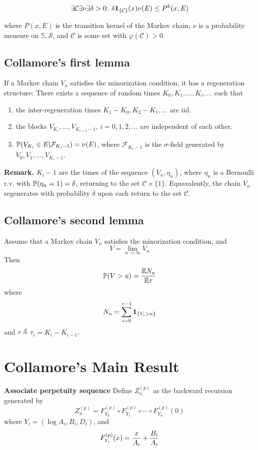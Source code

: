\documentclass[12pt]{article}
\begin{document}
\begin{equation}\label{eq:M}
\exists \mathcal C \exists \nu \exists \delta > 0\text{: }
\delta \I{\mathcal C}(x) \nu(E) \leq P^k(x, E)
\end{equation}

where $P(x, E)$ is the transition kernel of the Markov chain, $\nu$
is a probability measure on $\mathbb S, \mathcal S$, and $\mathcal C$
is some set with $\varphi(\mathcal C) > 0$.

\subsection{Collamore's first lemma}
If a Markov chain $V_n$ satisfies the minorization condition, it has a
regeneration structure: There exists a sequence of random times $K_0,
K_1, \dots, K_i, \dots$ such that
\begin{enumerate}
\item the inter-regeneration times $K_1 - K_0, K_2 - K_1, \dots$ are iid.
\item the blocks $V_{K_i}, \dots, V_{K_{i+1}-1}$, $i=0, 1, 2, \dots$ are
independent of each other.

\item $\P(V_{K_i} \in E | \mathcal F_{K_i - 1}) = \nu(E)$, where $\mathcal
F_{K_i - 1}$ is the $\sigma$-field generated by $V_0, V_1, \dots, V_{K_i-1}$.
\end{enumerate}

{\bf Remark. } $K_i-1$ are the times of the sequence $(V_n, \eta_n)$, where
$\eta_n$ is a Bernoulli r.v. with $\P(\eta_n = 1) = \delta$, returning to
the set $\mathcal C \times \{1\}$. Equavalently, the chain $V_n$ regenerates
with probability $\delta$ upon each return to the set $\mathcal C$.

\subsection{Collamore's second lemma}
Assume that a Markov chain $V_n$ satisfies the minorization condition, and
\[
        V = \lim_{n \to \infty} V_n
\]
Then
\[
\P(V > u) = {\E N_u \over \E \tau}
\]
where
\[
        N_u = \sum_{i=0}^{\tau - 1} \I{V_i > u}
\]
and $\tau \overset{d}{=} \tau_i = K_i - K_{i-1}$.

\section{Collamore's Main Result}
{\bf Associate perpetuity sequence}
Define $Z^{(p)}_n$ as the backward recursion generated by
\[
Z^{(p)}_n = F^{(p)}_{Y_0} \circ F^{(p)}_{Y_1} \circ \cdots
\circ F^{(p)}_{Y_n}(0)
\]
where $Y_i = (\log A_i, B_i, D_i)$, and
\[
F^{(p)}_{Y_i}(x) = {x \over A_i} + {B_i \over A_i}
\]
\end{document}
